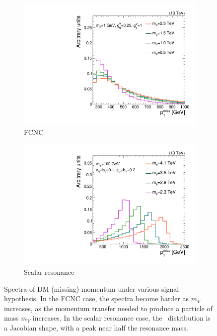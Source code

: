 \begin{figure}[]
    \begin{center}
        \begin{subfigure}[t]{0.49\textwidth}
            \includegraphics[width=\textwidth]{figures/monotop/diagrams/fcnc_pfmet.pdf}
            \caption{FCNC}
        \end{subfigure}
        \begin{subfigure}[t]{0.49\textwidth}
            \includegraphics[width=\textwidth]{figures/monotop/diagrams/res_pfmet.pdf}
            \caption{Scalar resonance}
        \end{subfigure}
        \caption{Spectra of DM (missing) momentum under various signal hypothesis.
                 In the FCNC case, the spectra become harder as $m_V$ increases, as the momentum transfer needed to produce a particle of mass $m_V$ increases.
                 In the scalar resonance case, the \ptmiss~distribution is a Jacobian shape, with a peak near half the resonance mass. }
        \label{fig:mt:shapes}
    \end{center}
\end{figure}

